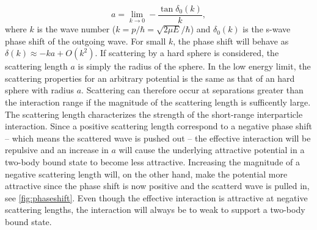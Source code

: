 \begin{equation} \label{eq:2}
a = \lim_{k \to 0} -\frac{\tan\delta_0(k)}{k},
\end{equation}
where $k$ is the wave number ($k=p/\hbar = \sqrt{2\mu E}/\hbar$) and $\delta_0(k)$ is the s-wave phase shift of the outgoing wave. For small $k$, the phase shift will behave as $\delta(k)\approx-ka + O(k^2)$. If scattering by a hard sphere is considered, the scattering length $a$ is simply the radius of the sphere. In the low energy limit, the scattering properties for an arbitrary potential is the same as that of an hard sphere with radius $a$. Scattering can therefore occur at separations greater than the interaction range if the magnitude of the scattering length is sufficently large. The scattering length characterizes the strength of the short-range interparticle interaction. Since a positive scattering length correspond to a negative phase shift -- which means the scattered wave is pushed out -- the effective interaction will be repulsive and an increase in $a$ will cause the underlying attractive potential in a two-body bound state to become less attractive. Increasing the magnitude of a negative scattering length will, on the other hand, make the potential more attractive since the phase shift is now positive and the scatterd wave is pulled in, see \cref{fig:phaseshift}. Even though the effective interaction is attractive at negative scattering lengths, the interaction will always be to weak to support a two-body bound state.  

